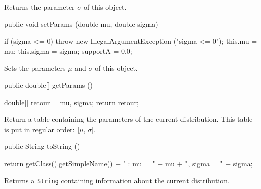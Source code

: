   \begin{tabb}  Returns the parameter $\sigma$ of this object.
  \end{tabb}
\begin{code}

   public void setParams (double mu, double sigma)\begin{hide} {
      if (sigma <= 0)
         throw new IllegalArgumentException ("sigma <= 0");
      this.mu = mu;
      this.sigma = sigma;
      supportA = 0.0;
   }\end{hide}
\end{code}
  \begin{tabb}  Sets the parameters $\mu$ and $\sigma$ of this object.
  \end{tabb}
\begin{code}

   public double[] getParams ()\begin{hide} {
      double[] retour = {mu, sigma};
      return retour;
   }\end{hide}
\end{code}
\begin{tabb}
   Return a table containing the parameters of the current distribution.
   This table is put in regular order: [$\mu$, $\sigma$].
\end{tabb}
\begin{hide}\begin{code}

   public String toString ()\begin{hide} {
      return getClass().getSimpleName() + " : mu = " + mu + ", sigma = " + sigma;
   }\end{hide}
\end{code}
\begin{tabb}
   Returns a \texttt{String} containing information about the current distribution.
\end{tabb}\end{hide}
\begin{code}\begin{hide}
}\end{hide}
\end{code}
